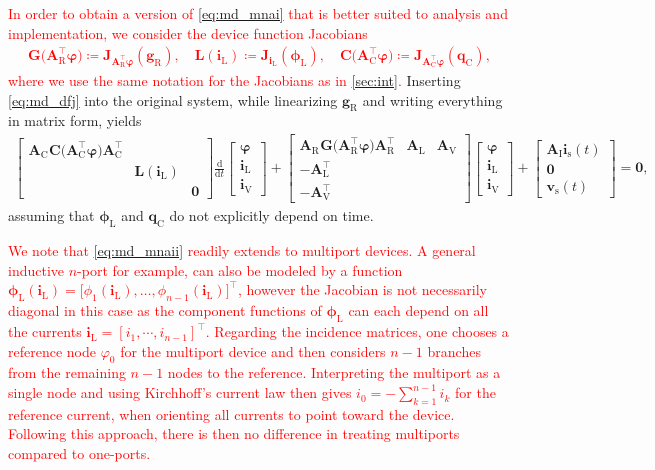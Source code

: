 \documentclass[AMA,STIX1COL]{WileyNJD-v2}
\newcommand{\mb}[1]{\mathbf{#1}}
\newcommand{\mr}[1]{\mathrm{#1}}
\newcommand{\T}{{\!\top}}
\newcommand{\ddt}{\frac{\mathrm{d}}{\mathrm{d}t}}
\newcommand{\A}[1]{\mb{A}_\mr{#1}}
\newcommand{\AT}[1]{\mb{A}_\mr{#1}^{\T}}
\newcommand{\qC}{\mb{q}_\mr{C}}
\newcommand{\gR}{\mb{g}_\mr{R}}
\newcommand{\phiL}{\boldsymbol{\phi}_\mr{L}}
\newcommand{\vphi}{\boldsymbol{\varphi}}
\renewcommand{\i}[1]{\mb{i}_\mr{#1}}
\renewcommand{\v}[1]{\mb{v}_\mr{#1}}
\begin{document}
\textcolor{red}{In order to obtain a version of \eqref{eq:md_mnai} that is better suited to analysis and implementation, we consider the device function Jacobians
\begin{align}
    \mb{G} \big( \AT{R} \vphi \big) \coloneqq \mb{J}_{\AT{R} \vphi}(\gR), \quad \mb{L}(\i{L}) \coloneqq \mb{J}_{\i{L}}(\phiL), \quad \mb{C} \big( \AT{C} \vphi \big) \coloneqq \mb{J}_{\AT{C} \vphi}(\qC), \label{eq:md_dfj}
\end{align}
where we use the same notation for the Jacobians as in \autoref{sec:int}.} Inserting \eqref{eq:md_dfj} into the original system, while linearizing $\gR$ and writing everything in matrix form, yields
\begin{align}
    \begin{bmatrix}
        \A{C}^{\phantom{\T}} \mb{C} \big( \AT{C} \vphi \big) \AT{C} & &\\
        & \mb{L}(\i{L}) &\\
        & & \mb{0}
    \end{bmatrix} \ddt \begin{bmatrix}
        \vphi\\
        \i{L}\\
        \i{V}
    \end{bmatrix} + \begin{bmatrix}
        \A{R}^{\phantom{\T}} \mb{G} \big( \AT{R} \vphi \big) \AT{R} & \A{L} & \A{V}\\
        -\AT{L} & &\\
        -\AT{V} & &
    \end{bmatrix} \begin{bmatrix}
        \vphi\\
        \i{L}\\
        \i{V}
    \end{bmatrix} + \begin{bmatrix}
        \A{I} \i{s}(t)\\
        \mb{0}\\
        \v{s}(t)
    \end{bmatrix} = \mb{0}, \label{eq:md_mnaii}
\end{align}
assuming that $\phiL$ and $\qC$ do not explicitly depend on time.

\textcolor{red}{We note that \eqref{eq:md_mnaii} readily extends to multiport devices\cite{tischendorf1999}. A general inductive $n$-port for example, can also be modeled by a function $\phiL(\i{L}) = \big[ \phi_1(\i{L}), \dotsc, \phi_{n-1}(\i{L}) \big]^\T$, however the Jacobian is not necessarily diagonal in this case as the component functions of $\phiL$ can each depend on all the currents $\i{L} = [i_1, \cdots, i_{n-1}]^\T$. Regarding the incidence matrices, one chooses a reference node $\varphi_0$ for the multiport device and then considers $n-1$ branches from the remaining $n-1$ nodes to the reference. Interpreting the multiport as a single node and using Kirchhoff's current law then gives $i_0 = -\sum_{k=1}^{n-1} i_k$ for the reference current, when orienting all currents to point toward the device. Following this approach, there is then no difference in treating multiports compared to one-ports\cite{tischendorf1999}.}
\end{document}
